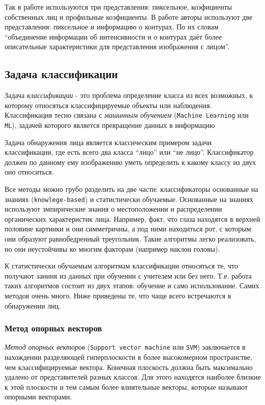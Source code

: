 \documentclass[12pt]{report}
\begin{document}
Так в работе \citep{bojkovic2006face} используются три представления: пиксельное, коэфициенты собственных лиц и профильные коэфициенты. В работе \citep{ahmadyfard2008hierarchical} авторы используют две представления: пиксельное и информацию о контурах. По их словам ``объединение информации об интенсивности и о контурах даёт более описательные характеристики для представления изображения с лицом''.

\subsection{Задача классификации}
\label{classficators}
Задача \emph{классификации} - это проблема определение класса из всех возможных, к которому относяться классифицируемые объекты или наблюдения. Классификация тесно связана с \emph{машинным обучением} (\texttt{Machine Learning} или \texttt{ML}), задачей которого является превращение данных в информацию \citep{bradski2008learning}

Задача обнаружения лица является классическим примером задачи классификации, где есть всего два класса ``лицо'' или ``не лицо''. Классификатор должен по данному ему изображению уметь определить к какому классу из двух оно относиться.

Все методы можно грубо разделить на две части: классификаторы основанные на знаниях (\texttt{knowlege-based}) и статистически обучаемые. Основанные на знаниях используют эмпирические знания о местоположении и распределении органических характеристик лица. \citep{bojkovic2006face} Например, факт, что глаза находятся в верхней половине картинки и они симметричны, а под ними находиться рот, с которым они образуют равнобедренный треугольник. Такие алгоритмы легко реализовать, но они неустойчивы ко многим факторам (например наклон головы).

К статистически обучаемым алгоритмам классификации относяться те, что получают заниня из данных при обучении с учителем или без него. Т.е. работа таких алгоритмов состоит из двух этапов: обучение и само использование. Самих методов очень много. Ниже приведены те, что чаще всего встречаются в обнаружении лиц. 

\subsubsection{Метод опорных векторов}
\emph{Метод опорных векторов} (\texttt{Support vector machine} или \texttt{SVM}) заключается в нахождении разделяющей гиперплоскости в более высокомерном пространстве, чем классифицируемые вектора. Конечная плоскость должна быть максимально удалено от представителей разных классов. Для этого находятся наиболее близкие к этой плоскости и тем самым более влиятельные векторы, которые называют опорными векторами. \citep{shavers2006svm}
\end{document}
